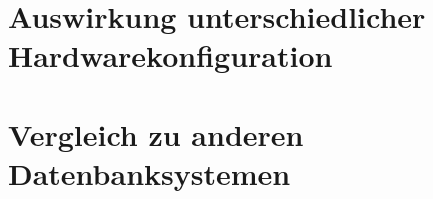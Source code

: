 \section{Auswirkung unterschiedlicher Hardwarekonfiguration}\label{auswertung:hardware}


\section{Vergleich zu anderen Datenbanksystemen}\label{auswertung:vergleich}


